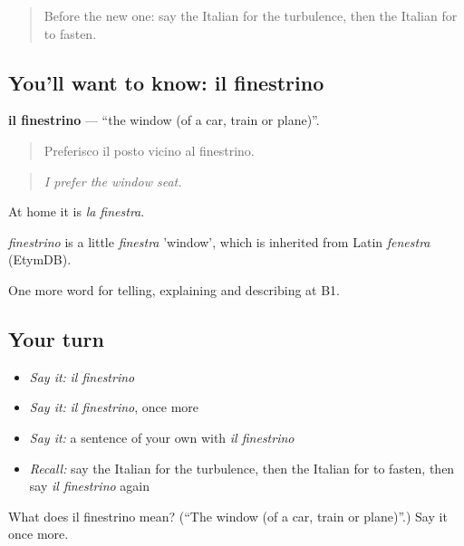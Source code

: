 \label{lesson:IT-C428-finestrino}



\begin{quote}
Before the new one: say the Italian for the turbulence, then the Italian for to fasten.
\end{quote}

\subsection*{You'll want to know: il finestrino}
\textbf{il finestrino} — \textquotedblleft{}the window (of a car, train or plane)\textquotedblright{}.

\begin{quote}
Preferisco il posto vicino al finestrino.
\end{quote}

\begin{quote}
\emph{I prefer the window seat.}
\end{quote}

At home it is \emph{la finestra}.

\begin{cousinweb}
\emph{finestrino} is a little \emph{finestra} 'window', which is inherited from Latin \emph{fenestra} (EtymDB).
\end{cousinweb}

\begin{grammarlens}[title={What you've built}]
One more word for telling, explaining and describing at B1.
\end{grammarlens}

\subsection*{Your turn}
\begin{itemize}
\raggedright
  \item \emph{Say it:} \emph{il finestrino}
  \item \emph{Say it:} \emph{il finestrino}, once more
  \item \emph{Say it:} a sentence of your own with \emph{il finestrino}
  \item \emph{Recall:} say the Italian for the turbulence, then the Italian for to fasten, then say \emph{il finestrino} again
\end{itemize}

\begin{tcolorbox}[breakable,colback=teal!4,colframe=teal!35!black,title={Before you move on}]
What does il finestrino mean? (\textquotedblleft{}The window (of a car, train or plane)\textquotedblright{}.) Say it once more.
\end{tcolorbox}
